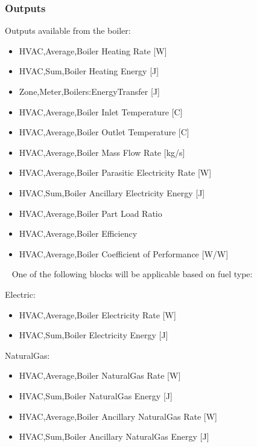 \subsubsection{Outputs}\label{outputs-10-005}

Outputs available from the boiler:

\begin{itemize}
    \item
    HVAC,Average,Boiler Heating Rate {[}W{]}
    \item
    HVAC,Sum,Boiler Heating Energy {[}J{]}
    \item
    Zone,Meter,Boilers:EnergyTransfer {[}J{]}
    \item
    HVAC,Average,Boiler Inlet Temperature {[}C{]}
    \item
    HVAC,Average,Boiler Outlet Temperature {[}C{]}
    \item
    HVAC,Average,Boiler Mass Flow Rate {[}kg/s{]}
    \item
    HVAC,Average,Boiler Parasitic Electricity Rate {[}W{]}
    \item
    HVAC,Sum,Boiler Ancillary Electricity Energy {[}J{]}
    \item
    HVAC,Average,Boiler Part Load Ratio
    \item
    HVAC,Average,Boiler Efficiency
    \item
    HVAC,Average,Boiler Coefficient of Performance {[}W/W{]}
\end{itemize}

~ One of the following blocks will be applicable based on fuel type:

Electric:

\begin{itemize}
    \item
    HVAC,Average,Boiler Electricity Rate {[}W{]}
    \item
    HVAC,Sum,Boiler Electricity Energy {[}J{]}
\end{itemize}

NaturalGas:

\begin{itemize}
    \item
    HVAC,Average,Boiler NaturalGas Rate {[}W{]}
    \item
    HVAC,Sum,Boiler NaturalGas Energy {[}J{]}
    \item
    HVAC,Average,Boiler Ancillary NaturalGas Rate {[}W{]}
    \item
    HVAC,Sum,Boiler Ancillary NaturalGas Energy {[}J{]}
\end{itemize}

